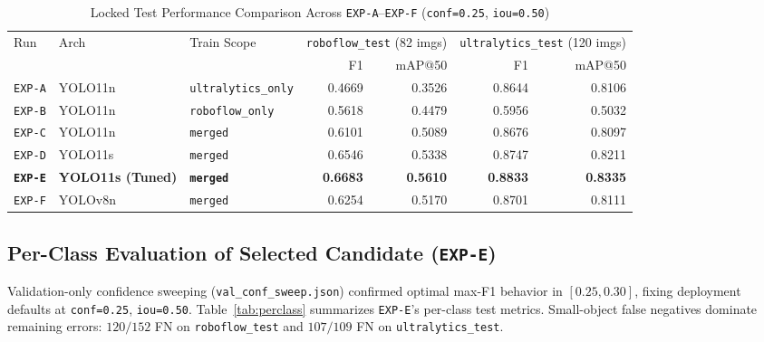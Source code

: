 \documentclass[11pt,a4paper]{article}
\begin{document}
\begin{table}[H]
\centering
\caption{Locked Test Performance Comparison Across \texttt{EXP-A}--\texttt{EXP-F} (\texttt{conf=0.25}, \texttt{iou=0.50})}
\label{tab:exp-matrix}
\small
\begin{tabular}{@{}lllrrrr@{}}
\toprule
Run & Arch & Train Scope & \multicolumn{2}{c}{\texttt{roboflow\_test} (82 imgs)} & \multicolumn{2}{c}{\texttt{ultralytics\_test} (120 imgs)} \\
\cmidrule(lr){4-5} \cmidrule(lr){6-7}
 & & & F1 & mAP@50 & F1 & mAP@50 \\
\midrule
\texttt{EXP-A} & YOLO11n & \texttt{ultralytics\_only} & 0.4669 & 0.3526 & 0.8644 & 0.8106 \\
\texttt{EXP-B} & YOLO11n & \texttt{roboflow\_only} & 0.5618 & 0.4479 & 0.5956 & 0.5032 \\
\texttt{EXP-C} & YOLO11n & \texttt{merged} & 0.6101 & 0.5089 & 0.8676 & 0.8097 \\
\texttt{EXP-D} & YOLO11s & \texttt{merged} & 0.6546 & 0.5338 & 0.8747 & 0.8211 \\
\textbf{\texttt{EXP-E}} & \textbf{YOLO11s (Tuned)} & \textbf{\texttt{merged}} & \textbf{0.6683} & \textbf{0.5610} & \textbf{0.8833} & \textbf{0.8335} \\
\texttt{EXP-F} & YOLOv8n & \texttt{merged} & 0.6254 & 0.5170 & 0.8701 & 0.8111 \\
\bottomrule
\end{tabular}
\end{table}

\subsection{Per-Class Evaluation of Selected Candidate (\texttt{EXP-E})}
Validation-only confidence sweeping (\texttt{val\_conf\_sweep.json}) confirmed optimal max-F1 behavior in $[0.25, 0.30]$, fixing deployment defaults at \texttt{conf=0.25}, \texttt{iou=0.50}. Table~\ref{tab:perclass} summarizes \texttt{EXP-E}'s per-class test metrics. Small-object false negatives dominate remaining errors: $120/152$ FN on \texttt{roboflow\_test} and $107/109$ FN on \texttt{ultralytics\_test}.
\end{document}
